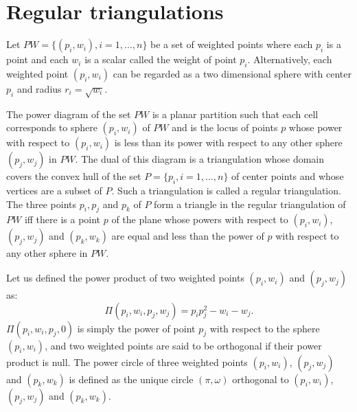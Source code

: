 

\section{Regular triangulations}
\label{I1_Sect_Regular}
 
Let ${  PW} = \{(p_i, w_i), i = 1, \ldots , n \}$ be a set of 
weighted points where each $p_i$ is a point and each $w_i$
is a scalar called the weight of point $p_i$.
Alternatively, each weighted point $(p_i, w_i)$ can be regarded
as a two dimensional sphere with center $p_i$ and radius $r_i=\sqrt{w_i}$.

The power diagram of the set ${  PW}$ is a planar partition 
such that each cell corresponds to sphere $(p_i, w_i)$ of ${  PW}$
and is the locus of points  $p$ whose power with respect to $(p_i, w_i)$
is less than its power with respect to any other sphere $(p_j, w_j)$
in ${  PW}$. 
The dual of this diagram is a triangulation 
whose domain covers the convex hull of the set 
${  P}= \{ p_i, i = 1, \ldots , n \}$ of center points
and whose vertices are a subset of ${  P}$.
Such a triangulation is called a regular triangulation.
The  three points $p_i, p_j$ and $p_k$ of ${  P}$
form a triangle in the regular triangulation of ${  PW}$
iff there is a point $p$ of the plane whose
powers with respect to $(p_i, w_i)$, $(p_j, w_j)$
and $(p_k, w_k)$ are equal and less than the power of $p$
with respect to any other sphere in  ${  PW}$.

Let us defined the power product of two weighted points
$(p_i, w_i)$ and $(p_j, w_j)$ as:
\[\Pi(p_i, w_i,p_j, w_j) = p_ip_j ^2 - w_i  - w_j  .\]
$\Pi(p_i, w_i,p_j, 0)$ is simply the power of point $p_j$
with respect to the sphere $(p_i, w_i)$, and two weighted points 
are said to be orthogonal if their power product is null.
The power circle of three weighted points
 $(p_i, w_i)$, $(p_j, w_j)$
and $(p_k, w_k)$ is defined as the unique circle
$(\pi, \omega)$  orthogonal to
 $(p_i, w_i)$, $(p_j, w_j)$
and $(p_k, w_k)$.

